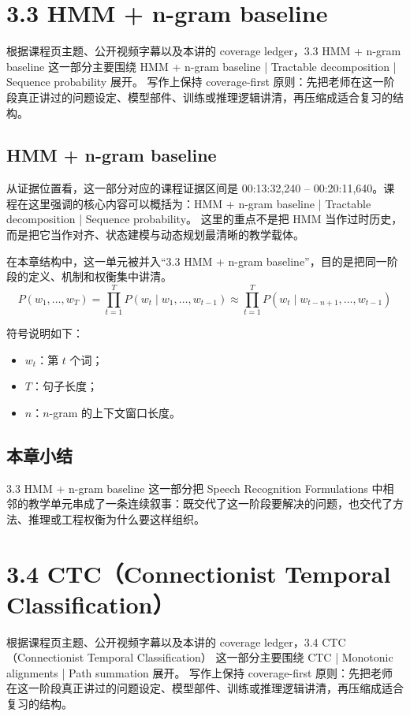 \documentclass[a4paper]{article}
\begin{document}
\section{3.3 HMM + n-gram baseline}
根据课程页主题、公开视频字幕以及本讲的 coverage ledger，3.3 HMM + n-gram baseline 这一部分主要围绕 HMM + n-gram baseline | Tractable decomposition | Sequence probability 展开。
写作上保持 coverage-first 原则：先把老师在这一阶段真正讲过的问题设定、模型部件、训练或推理逻辑讲清，再压缩成适合复习的结构。

\subsection{HMM + n-gram baseline}
从证据位置看，这一部分对应的课程证据区间是 00:13:32,240 -- 00:20:11,640。课程在这里强调的核心内容可以概括为：HMM + n-gram baseline | Tractable decomposition | Sequence probability。
这里的重点不是把 HMM 当作过时历史，而是把它当作对齐、状态建模与动态规划最清晰的教学载体。

在本章结构中，这一单元被并入“3.3 HMM + n-gram baseline”，目的是把同一阶段的定义、机制和权衡集中讲清。
\[
P(w_1,\dots,w_T) = \prod_{t=1}^{T} P(w_t \mid w_1,\dots,w_{t-1}) \approx \prod_{t=1}^{T} P(w_t \mid w_{t-n+1},\dots,w_{t-1})
\]

符号说明如下：
\begin{itemize}
\item $w_t$：第 $t$ 个词；
\item $T$：句子长度；
\item $n$：$n$-gram 的上下文窗口长度。
\end{itemize}

\subsection{本章小结}
3.3 HMM + n-gram baseline 这一部分把 Speech Recognition Formulations 中相邻的教学单元串成了一条连续叙事：既交代了这一阶段要解决的问题，也交代了方法、推理或工程权衡为什么要这样组织。

\section{3.4 CTC（Connectionist Temporal Classification）}
根据课程页主题、公开视频字幕以及本讲的 coverage ledger，3.4 CTC（Connectionist Temporal Classification） 这一部分主要围绕 CTC | Monotonic alignments | Path summation 展开。
写作上保持 coverage-first 原则：先把老师在这一阶段真正讲过的问题设定、模型部件、训练或推理逻辑讲清，再压缩成适合复习的结构。
\end{document}
